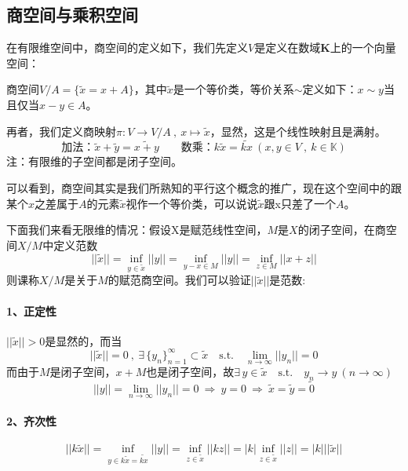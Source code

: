\subsection{商空间与乘积空间}
在有限维空间中，商空间的定义如下，我们先定义$V$是定义在数域$\mathbf{K}$上的一个向量空间：
\begin{definition}[商空间]
    商空间$V/A=\{\tilde{x}=x+A\}$，其中$\tilde{x}$是一个等价类，等价关系$\sim$定义如下：$x \sim y$当且仅当$x-y \in A$。
\end{definition}
再者，我们定义商映射$\pi:V \to V/A \ , \ x \mapsto \tilde{x}$，显然，这是个线性映射且是满射。
\[\text{加法：}\tilde{x}+\tilde{y}=\tilde{x+y} \qquad \text{数乘：}k\tilde{x}=\tilde{kx} \ (x,y \in V \ , \ k \in \mathbb{K})\]
注：有限维的子空间都是闭子空间。

可以看到，商空间其实是我们所熟知的平行这个概念的推广，现在这个空间中的跟某个$x$之差属于$A$的元素$\tilde{x}$视作一个等价类，可以说说$\tilde{x}$跟x只差了一个$A$。

下面我们来看无限维的情况：假设X是赋范线性空间，$M$是$X$的闭子空间，在商空间$X/M$中定义范数
\[||\tilde{x}||=\mathop \text{inf}\limits_{y \in \tilde{x}}||y||=\mathop \text{inf}\limits_{y-x \in M}||y||=\mathop \text{inf}\limits_{z \in M}||x+z||\]
则课称$X/M$是关于$M$的赋范商空间。我们可以验证$||\tilde{x}||$是范数:
\paragraph*{1、正定性} \quad $||\tilde{x}||>0$是显然的，而当
\[||\tilde{x}||=0 \ , \ \exists \, \{y_n\}_{n=1}^{\infty} \subset \tilde{x} \quad \text{s.t.} \quad \lim_{n \to \infty}||y_n||=0\]
而由于$M$是闭子空间，$x+M$也是闭子空间，故$\exists \, y \in \tilde{x} \quad \text{s.t.} \quad y_n \to y \ (n \to \infty)$
\[||y||=\lim_{n \to \infty}||y_n||=0 \ \Rightarrow \ y=0 \ \Rightarrow \ \tilde{x}=\tilde{y}=\tilde{0}\]
\paragraph*{2、齐次性}
\[||k\tilde{x}||=\mathop \text{inf}\limits_{y \in k\tilde{x}=\tilde{kx}}||y||=\mathop \text{inf}\limits_{z \in \tilde{x}}||kz||=|k|\mathop \text{inf}\limits_{z \in \tilde{x}}||z||=|k|||\tilde{x}||\] 
